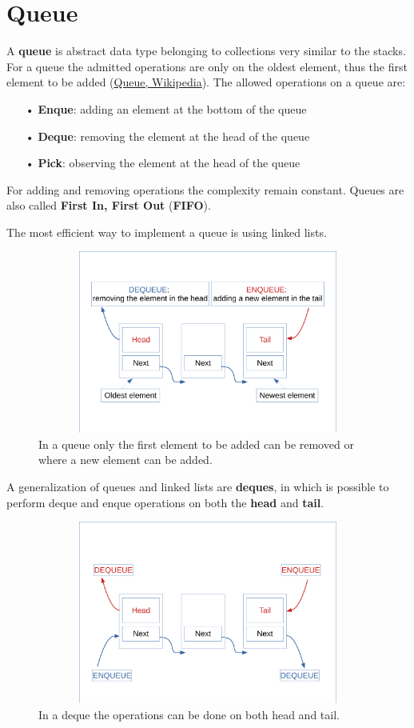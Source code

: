 \section{Queue}
A \textbf{queue} is abstract data type belonging to collections very similar to the stacks. For a queue the admitted operations are only on the oldest element, thus the first element to be added \cite{wikiqueue} (\href{https://en.wikipedia.org/wiki/Queue_(abstract_data_type)}{Queue, Wikipedia}). The allowed operations on a queue are:
\begin{itemize}
\item[•] \textbf{Enque}: adding an element at the bottom of the queue
\item[•] \textbf{Deque}: removing the element at the head of the queue
\item[•] \textbf{Pick}: observing the element at the head of the queue
\end{itemize}
For adding and removing operations the complexity remain constant. Queues are also called \textbf{First In, First Out} (\textbf{FIFO}). 

The most efficient way to implement a queue is using linked lists.

\begin{figure}[h]
	\includegraphics[width=14cm,height=6cm]{chapters/datastructures/images/queue_1.pdf}
	\caption[]{In a queue only the first element to be added can be removed or where a new element can be added.}
	\label{queue_1}
\end{figure}

A generalization of queues and linked lists are \textbf{deques}, in which is possible to perform deque and enque operations on both the \textbf{head} and \textbf{tail}.

\begin{figure}[h]
	\includegraphics[width=14cm,height=6cm]{chapters/datastructures/images/queue_2.pdf}
	\caption[]{In a deque the operations can be done on both head and tail.}
	\label{queue_2}
\end{figure}

